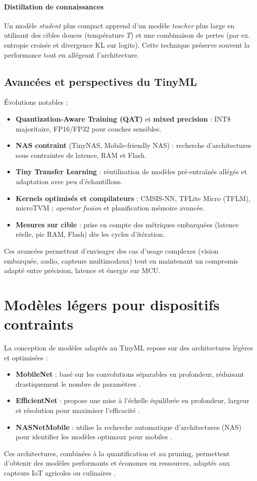 \paragraph{Distillation de connaissances}  
Un modèle \emph{student} plus compact apprend d’un modèle \emph{teacher} plus large en utilisant des cibles douces (température \(T\)) et une combinaison de pertes (par ex. entropie croisée et divergence KL sur logits). Cette technique préserve souvent la performance tout en allégeant l’architecture.

\subsection{Avancées et perspectives du TinyML}
Évolutions notables :
\begin{itemize}
    \item \textbf{Quantization-Aware Training (QAT)} et \textbf{mixed precision} : INT8 majoritaire, FP16/FP32 pour couches sensibles.
    \item \textbf{NAS contraint} (TinyNAS, Mobile-friendly NAS) : recherche d’architectures sous contraintes de latence, RAM et Flash.
    \item \textbf{Tiny Transfer Learning} : réutilisation de modèles pré-entraînés allégés et adaptation avec peu d’échantillons.
    \item \textbf{Kernels optimisés et compilateurs} : CMSIS-NN, TFLite Micro (TFLM), microTVM ; \emph{operator fusion} et planification mémoire avancée.
    \item \textbf{Mesures sur cible} : prise en compte des métriques embarquées (latence réelle, pic RAM, Flash) dès les cycles d’itération.
\end{itemize}
Ces avancées permettent d’envisager des cas d’usage complexes (vision embarquée, audio, capteurs multimodaux) tout en maintenant un compromis adapté entre précision, latence et énergie sur MCU.

\section{Modèles légers pour dispositifs contraints}
La conception de modèles adaptés au TinyML repose sur des architectures légères et optimisées :
\begin{itemize}
    \item \textbf{MobileNet} : basé sur les convolutions séparables en profondeur, réduisant drastiquement le nombre de paramètres \cite{howard2017mobilenets}.
    \item \textbf{EfficientNet} : propose une mise à l’échelle équilibrée en profondeur, largeur et résolution pour maximiser l’efficacité \cite{tan2019mnasnet}.
    \item \textbf{NASNetMobile} : utilise la recherche automatique d’architectures (NAS) pour identifier les modèles optimaux pour mobiles \cite{zoph2018}.
\end{itemize}
Ces architectures, combinées à la quantification et au pruning, permettent d’obtenir des modèles performants et économes en ressources, adaptés aux capteurs IoT agricoles ou culinaires \cite{moeketsi2025}.


